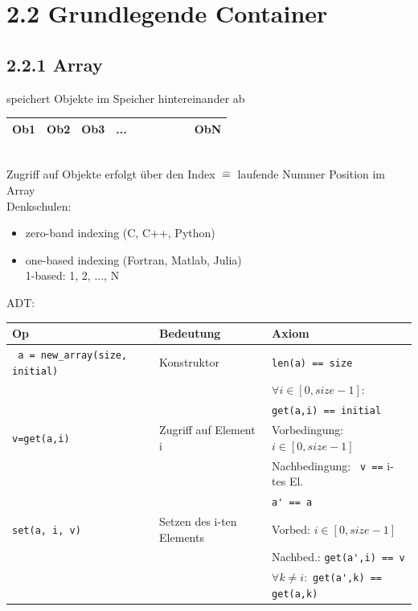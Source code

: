 \documentclass[11pt, fleqn]{scrreprt}
\begin{document}
\section*{2.2 Grundlegende Container}

    \subsection*{2.2.1 Array}
    speichert Objekte im Speicher hintereinander ab \\

    \begin{tabular}{| C{1cm} | C{1cm} | C{1cm} | C{1cm} |C{1cm} | C{1cm}| C{1cm} |C{1cm}| C{1cm}| C{1cm}| }
        \hline
        Ob1 & Ob2 & Ob3 & ... & & & & & & ObN \\ \hline
    \end{tabular} \\

    Zugriff auf Objekte erfolgt über den Index $\widehat{=}$ laufende Nummer Position im Array \\

    Denkschulen:
    \begin{itemize}
        \item zero-band indexing (C, C++, Python) \\
        \item one-based indexing (Fortran, Matlab, Julia)\\
        1-based: 1, 2, ..., N
    \end{itemize}

    ADT: \\
    \begin{tabular}{C{5cm} C{5cm} C{5cm}}
        Op & Bedeutung & Axiom \\ \hline
        \verb| a = new_array(size, initial)| & Konstruktor & \verb|len(a) == size| \\
        & & $\forall i \in [0, size - 1]$: \\
        & & \verb|get(a,i) == initial| \\ \hline
        \verb|v=get(a,i)| & Zugriff auf Element i & Vorbedingung: $i \in [0, size-1]$ \\
        & & Nachbedingung: \verb| v ==| i-tes El. \\
        & & \verb|a' == a| \\ \hline
        \verb|set(a, i, v)| & Setzen des i-ten Elements & Vorbed: $ i \in [0, size-1]$ \\
        & & Nachbed.: \verb|get(a',i) == v| \\
        & & $\forall k \neq i:$ \verb|get(a',k) == get(a,k)| \\
    \end{tabular}
\end{document}
